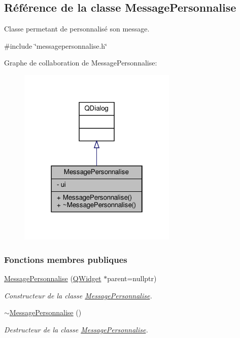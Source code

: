\hypertarget{class_message_personnalise}{}\subsection{Référence de la classe Message\+Personnalise}
\label{class_message_personnalise}


Classe permetant de personnalisé son message.  




{\ttfamily \#include \char`\"{}messagepersonnalise.\+h\char`\"{}}



Graphe de collaboration de Message\+Personnalise\+:
\nopagebreak
\begin{figure}[H]
\begin{center}
\leavevmode
\includegraphics[width=214pt]{class_message_personnalise__coll__graph}
\end{center}
\end{figure}
\subsubsection*{Fonctions membres publiques}
\begin{DoxyCompactItemize}
\item 
\hyperlink{class_message_personnalise_ac36a9573287d1119566790a4fad25dbc}{Message\+Personnalise} (\hyperlink{class_q_widget}{Q\+Widget} $\ast$parent=nullptr)
\begin{DoxyCompactList}\small\item\em Constructeur de la classe \hyperlink{class_message_personnalise}{Message\+Personnalise}. \end{DoxyCompactList}\item 
\hyperlink{class_message_personnalise_aff9181649ac956114f02660582e86cfc}{$\sim$\+Message\+Personnalise} ()
\begin{DoxyCompactList}\small\item\em Destructeur de la classe \hyperlink{class_message_personnalise}{Message\+Personnalise}. \end{DoxyCompactList}\end{DoxyCompactItemize}
